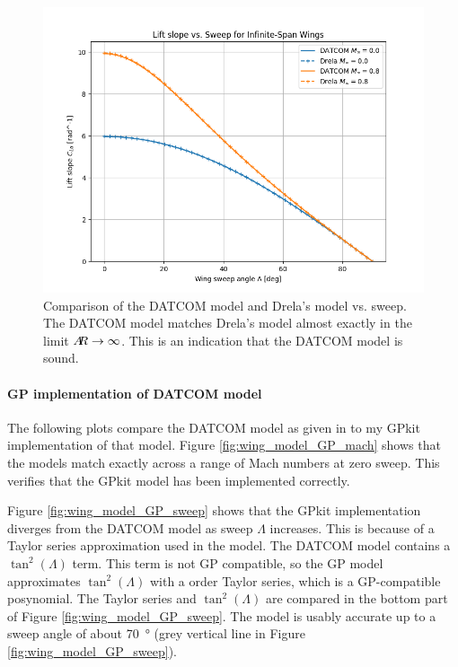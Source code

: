 \documentclass[12pt]{article}
\newcommand{\ar}{A\mkern-6mu R}
\begin{document}
\begin{figure}[hbt!]
    \centering
    \includegraphics[width=1\textwidth]{figures/wing_lift_model_compare/CLa_vs_sweep}
    \caption{\label{fig:wing_model_CLa_vs_sweep} Comparison of the DATCOM model and Drela's model vs. sweep. The DATCOM model matches Drela's model almost exactly in the limit $\ar \rightarrow \infty$. This is an indication that the DATCOM model is sound.}
\end{figure}


\paragraph{GP implementation of DATCOM model}
The following plots compare the DATCOM model as given in \cite{Raymer2012} to my GPkit implementation of that model. Figure \ref{fig:wing_model_GP_mach} shows that the models match exactly across a range of Mach numbers at zero sweep. This verifies that the GPkit model has been implemented correctly.

Figure \ref{fig:wing_model_GP_sweep} shows that the GPkit implementation diverges from the DATCOM model as sweep $\Lambda$ increases. This is because of a Taylor series approximation used in the model. The DATCOM model contains a $\tan^2(\Lambda)$ term. This term is not GP compatible, so the GP model approximates $\tan^2(\Lambda)$ with a  order Taylor series, which is a GP-compatible posynomial. The Taylor series and $\tan^2(\Lambda)$ are compared in the bottom part of Figure \ref{fig:wing_model_GP_sweep}. The model is usably accurate up to a sweep angle of about \SI{70}{\degree} (grey vertical line in Figure \ref{fig:wing_model_GP_sweep}).
\end{document}

